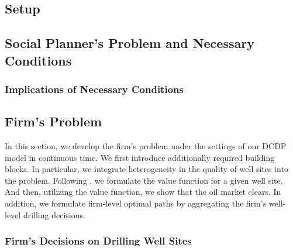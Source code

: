 \subsection{Setup}
\label{C3-SubSection:Setup}


\subsection{Social Planner's Problem and Necessary Conditions}
\label{C3-SubSection:Social-Planners-Problem-and-Necessary-Conditions}


\subsubsection{Implications of Necessary Conditions}
\label{C3-SubSubSection:Necessary-Conditions}


\subsection{Firm's Problem}
\label{C3-SubSection:Firms-Problem}
In this section, we develop the firm's problem under the settings of our DCDP model in continuous time. We first introduce additionally required building blocks. In particular, we integrate heterogeneity in the quality of well sites into the problem. Following \cite{Estimation-of-Dynamic-Discrete-Choice-Models-in-Continuous-Time_ABBE_2016}, we formulate the value function for a given well site. And then, utilizing the value function, we show that the oil market clears. In addition, we formulate firm-level optimal paths by aggregating the firm's well-level drilling decisions. 

\subsubsection{Firm's Decisions on Drilling Well Sites}
\label{C3-SubSubSection:Firms-Decisions-on-Drilling-Well-Sites}


